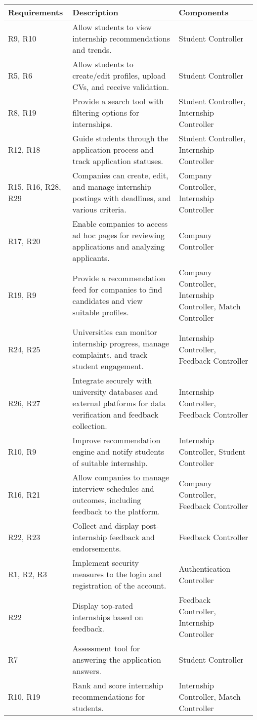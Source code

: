 \begin{longtable}{|p{3cm}|p{5cm}|p{4cm}|}
\hline
\textbf{Requirements} & \textbf{Description} & \textbf{Components} \\
\hline

R9, R10 & Allow students to view internship recommendations and trends. & Student Controller \\
\hline
R5, R6 & Allow students to create/edit profiles, upload CVs, and receive validation. & Student Controller \\
\hline
R8, R19 & Provide a search tool with filtering options for internships. & Student Controller, Internship Controller \\
\hline
R12, R18 & Guide students through the application process and track application statuses. & Student Controller, Internship Controller \\
\hline
R15, R16, R28, R29 & Companies can create, edit, and manage internship postings with deadlines, and various criteria. & Company Controller, Internship Controller \\
\hline
R17, R20 & Enable companies to access ad hoc pages for reviewing applications and analyzing applicants. & Company Controller \\
\hline
R19, R9 & Provide a recommendation feed for companies to find candidates and view suitable profiles. & Company Controller, Internship Controller, Match Controller \\
\hline
R24, R25 & Universities can monitor internship progress, manage complaints, and track student engagement. & Internship Controller, Feedback Controller \\
\hline
R26, R27 & Integrate securely with university databases and external platforms for data verification and feedback collection. & Internship Controller, Feedback Controller \\
\hline
R10, R9 & Improve recommendation engine and notify students of suitable internship. & Internship Controller, Student Controller \\
\hline
R16, R21 & Allow companies to manage interview schedules and outcomes, including feedback to the platform. & Company Controller, Feedback Controller \\
\hline
R22, R23 & Collect and display post-internship feedback and endorsements. & Feedback Controller \\
\hline
R1, R2, R3 & Implement security measures to the login and registration of the account. & Authentication Controller \\
\hline
R22 & Display top-rated internships based on feedback. & Feedback Controller, Internship Controller \\
\hline
R7 & Assessment tool for answering the application answers. & Student Controller \\
\hline
R10, R19 & Rank and score internship recommendations for students. & Internship Controller, Match Controller \\
\hline
\end{longtable}
